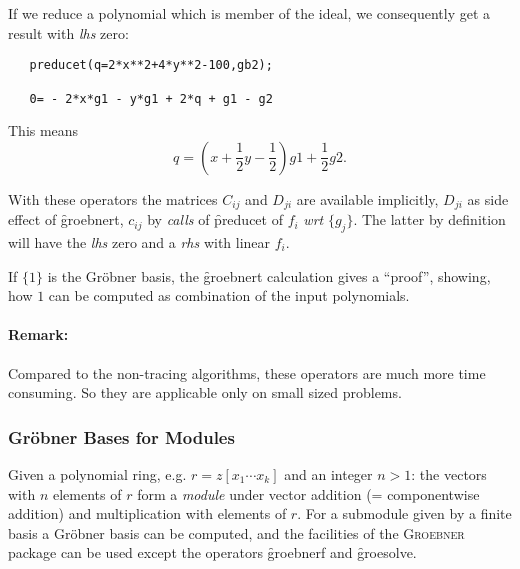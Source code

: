 \example {}

If we reduce a polynomial which is member of the ideal, we
consequently get a result with \textit{lhs} zero:
\begin{verbatim}
   preducet(q=2*x**2+4*y**2-100,gb2);

   0= - 2*x*g1 - y*g1 + 2*q + g1 - g2
\end{verbatim}

This means
\[ q = ( x + \frac{1}{2} y - \frac{1}{2}) g1 + \frac{1}{2} g2.
\]

With these operators the matrices $C_{ij}$ and $D_{ji}$ are available
implicitly, $D_{ji}$ as side effect of \f{groebnert}, $c_{ij}$ by \emph{calls}
of \f{preducet} of $f_i$ \textit{wrt} $\{g_j\}$. The latter by definition will
have the \textit{lhs} zero and a \textit{rhs} with linear $f_i$.

If $\{1\}$ is the Gr\"obner basis, the \f{groebnert} calculation gives
a ``proof'', showing,  how  $1$ can be computed as combination of the
input polynomials.

\paragraph{Remark:} Compared to the non-tracing algorithms, these
operators are much more time consuming. So they are applicable
only on small sized problems.

\subsubsection{Gr\"obner Bases for Modules}

Given a polynomial ring, e.g. $r=z[x_1 \cdots x_k]$ and
an integer $n>1$: the vectors with $n$ elements of $r$
form a \emph{module} under vector addition (= componentwise addition)
and multiplication with elements of $r$. For a submodule
given by a finite basis a Gr\"obner basis
can be computed, and the facilities of the \textsc{Groebner} package
can be used except the operators \f{groebnerf} and \f{groesolve}.

